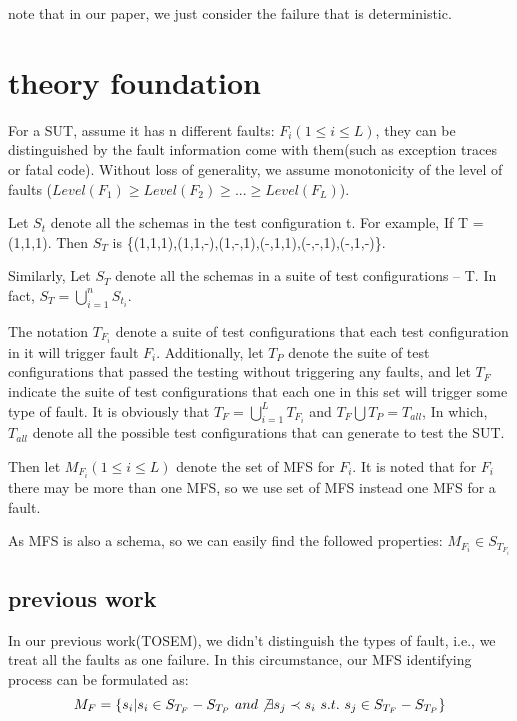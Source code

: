 \documentclass{sig-alternate}
\begin{document}
note that in our paper, we just consider the failure that is deterministic.

\section{theory foundation}
For a SUT, assume it has n different faults: $F_{i} ( 1 \leq i \leq L)$, they can be distinguished by the fault information come with them(such as exception traces or fatal code). Without loss of generality, we assume monotonicity of the level of faults ($Level(F_{1}) \geq Level(F_{2}) \geq ... \geq Level(F_{L}) $).

Let $S_{t}$ denote all the schemas in the test configuration t.  For example, If T = (1,1,1). Then $S_{T}$ is \{(1,1,1),(1,1,-),(1,-,1),(-,1,1),(-,-,1),(-,1,-)\}.

Similarly, Let $S_{T}$ denote all the schemas in a suite of test configurations -- T. In fact, $S_{T} = \bigcup_{i = 1}^{n}S_{t_{i}}$.

The notation $T_{F_{i}}$ denote a suite of test configurations that each test configuration in it will trigger fault $F_{i}$. Additionally, let $T_{P}$ denote the suite of test configurations that passed the testing without triggering any faults, and let $T_{F}$ indicate the suite of test configurations that each one in this set will trigger some type of fault. It is obviously that $T_{F} =  \bigcup_{i = 1}^{L}T_{F_{i}}$ and $T_{F}\bigcup T_{P} = T_{all}$, In which, $T_{all}$ denote all the possible test configurations that can generate to test the SUT.


Then let $ M_{F_{i}} ( 1 \leq i \leq L) $ denote the set of MFS for $F_{i}$. It is noted that for $F_{i}$ there may be more than one MFS, so we use set of MFS instead one MFS for a fault.

As MFS is also a schema, so we can easily find the followed properties:
$ M_{F_{i}} \in S_{T_{F_{i}}} $



\subsection{previous work}

In our previous work(TOSEM), we didn't distinguish the types of fault, i.e., we treat all the faults as one failure. In this circumstance, our MFS identifying process can be formulated as:
$$ M_{F} = \{s_{i} | s_{i} \in S_{T_{F}} - S_{T_{P}}\ and \not\exists s_{j} \prec s_{i}\ s.t.\ s_{j} \in S_{T_{F}} - S_{T_{P}} \}$$
\end{document}
